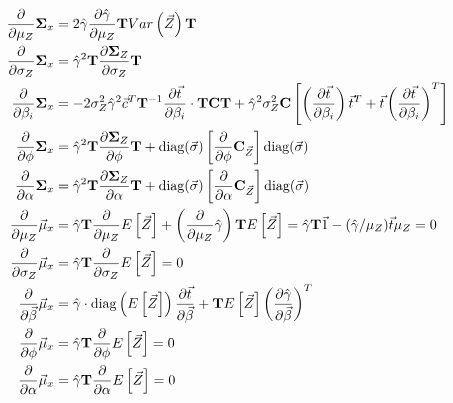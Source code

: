 {\begin{align*}
\frac{\partial}{\partial \mu_Z} \mathbf{\Sigma}_x &= 2 \hat{\gamma} \frac{\partial \hat{\gamma}}{\partial \mu_Z} \mathbf{T} Var\left(\vec{Z}\right) \mathbf{T} \\
\frac{\partial}{\partial \sigma_Z} \mathbf{\Sigma}_x &= \hat{\gamma}^2 \mathbf{T} \frac{\partial \mathbf{\Sigma}_Z}{\partial \sigma_Z} \mathbf{T} \\
\frac{\partial}{\partial \beta_i} \mathbf{\Sigma}_x &= -2 \sigma_Z^2 \hat{ \gamma }^2 \vec{c}^T \mathbf{T}^{-1} \frac{\partial \vec{t}}{\partial  \beta_i}   \cdot \mathbf{T} \mathbf{C} \mathbf{T} + \hat{ \gamma }^2  \sigma_Z^2 \mathbf{C} \left[\left(\frac{\partial \vec{t}}{\partial  \beta_i}\right) \vec{t}^T + \vec{t} \left(\frac{\partial \vec{t}}{\partial  \beta_i}\right)^T\right]\\
\frac{\partial}{\partial \phi} \mathbf{\Sigma}_x &= \hat{\gamma}^2 \mathbf{T} \frac{\partial \mathbf{\Sigma}_Z}{\partial \phi} \mathbf{T}  + \text{diag}(\vec{\sigma })\left  [\frac{\partial}{\partial \phi } \mathbf{C}_{\vec{Z}}\right ] \text{diag}(\vec{\sigma }) \\
\frac{\partial}{\partial \alpha } \mathbf{\Sigma}_x &= \hat{\gamma}^2 \mathbf{T} \frac{\partial \mathbf{\Sigma}_Z}{\partial \alpha } \mathbf{T}  + \text{diag}(\vec{\sigma })\left  [\frac{\partial}{\partial \alpha } \mathbf{C}_{\vec{Z}}\right ] \text{diag}(\vec{\sigma }) \\
\frac{\partial}{\partial \mu_Z} \vec{\mu}_x &= \hat{\gamma} \mathbf{T} \frac{\partial}{\partial \mu_Z} E\left[ \vec{Z} \right] + \left( \frac{\partial}{\partial \mu_Z} \hat{\gamma} \right) \mathbf{T} E\left[ \vec{Z} \right] = \hat{\gamma} \mathbf{T} \vec{1} - (\hat{\gamma}/\mu_Z) \vec{t} \mu_Z = 0 \\
\frac{\partial}{\partial \sigma_Z} \vec{\mu}_x &= \hat{\gamma} \mathbf{T} \frac{\partial}{\partial \sigma_Z} E\left[ \vec{Z} \right] = 0 \\
\frac{\partial}{\partial \vec{\beta}} \vec{\mu}_x &= \hat{\gamma} \cdot \text{diag}\left(E\left[ \vec{Z} \right]\right) \frac{\partial \vec{t}}{\partial \vec{\beta}} +  \mathbf{T} E\left[ \vec{Z} \right] \left(\frac{\partial \hat{\gamma}}{\partial \vec{\beta}} \right)^T \\
\frac{\partial}{\partial \phi} \vec{\mu}_x &= \hat{\gamma} \mathbf{T} \frac{\partial}{\partial \phi} E\left[ \vec{Z} \right] = 0 \\
\frac{\partial}{\partial \alpha} \vec{\mu}_x &= \hat{\gamma} \mathbf{T} \frac{\partial}{\partial \alpha } E\left[ \vec{Z} \right] = 0
\end{align*}

}
